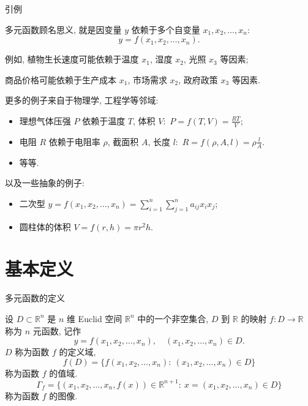 \begin{frame}{引例}

多元函数顾名思义, 就是因变量 $y$ 依赖于多个自变量 $x_1, x_2, \ldots, x_n:$
\[y = f(x_1, x_2, \ldots, x_n).\]

\pause
\vspace{0.5em}

例如, 植物生长速度可能依赖于温度 $x_1$, 湿度 $x_2$, 光照 $x_3$ 等因素;

商品价格可能依赖于生产成本 $x_1$, 市场需求 $x_2$, 政府政策 $x_3$ 等因素.

\pause
\vspace{0.5em}

更多的例子来自于物理学, 工程学等邻域:

\begin{itemize}
\item 理想气体压强 $P$ 依赖于温度 $T$, 体积 $V:$ $P = f(T, V) = \frac{RT}{V}$;
\item 电阻 $R$ 依赖于电阻率 $\rho$, 截面积 $A$, 长度 $l:$ $R = f(\rho, A, l) = \rho \frac{l}{A}$.
\item 等等.
\end{itemize}

\pause
\vspace{0.5em}

以及一些抽象的例子:

\begin{itemize}
\item 二次型 $y = f(x_1, x_2, \ldots, x_n) = \sum_{i=1}^n \sum_{j=1}^n a_{ij} x_i x_j$;
\item 圆柱体的体积 $V = f(r, h) = \pi r^2 h$.
\end{itemize}

\end{frame}


\section{基本定义}


\begin{frame}{多元函数的定义}

\begin{Def}[多元函数]
设 $D \subset \mathbb{R}^n$ 是 $n$ 维 Euclid 空间 $\mathbb{R}^n$ 中的一个非空集合, $D$ 到 $\mathbb{R}$ 的映射 $f: D \to \mathbb{R}$ 称为 $n$ 元函数, 记作
\[y = f(x_1, x_2, \ldots, x_n), \quad (x_1, x_2, \ldots, x_n) \in D.\]
\pause
$D$ 称为函数 $f$ 的定义域,
\[f(D) = \{f(x_1, x_2, \ldots, x_n): ~ (x_1, x_2, \ldots, x_n) \in D\}\]
称为函数 $f$ 的值域.
\pause
\[\Gamma_f = \{(x_1, x_2, \ldots, x_n, f(x)) \in \mathbb{R}^{n+1}: ~ x = (x_1, x_2, \ldots, x_n) \in D\}\]
称为函数 $f$ 的图像.
\end{Def}

\end{frame}

